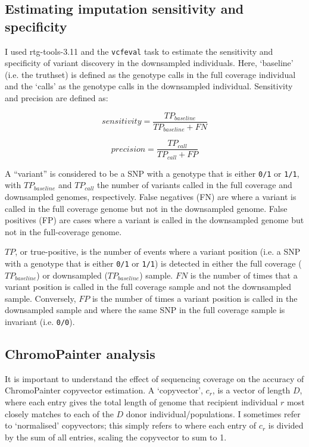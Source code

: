 \subsection{Estimating imputation sensitivity and specificity}

I used rtg-tools-3.11 \cite{cleary2014joint} and the \texttt{vcfeval} task to estimate the sensitivity and specificity of variant discovery in the downsampled individuals. Here, `baseline' (i.e. the truthset) is defined as the genotype calls in the full coverage individual and the `calls' as the genotype calls in the downsampled individual. Sensitivity and precision are defined as: 

\begin{equation}
sensitivity = \frac{TP_{baseline}}{TP_{baseline} + FN}
\end{equation}

\begin{equation}
precision = \frac{TP_{call}}{TP_{call} + FP}
\end{equation}

A ``variant'' is considered to be a SNP with a genotype that is either \texttt{0/1} or \texttt{1/1}, with $TP_{baseline}$ and $TP_{call}$ the number of variants called in the full coverage and downsampled genomes, respectively. False negatives (FN) are where a variant is called in the full coverage genome but not in the downsampled genome. False positives (FP) are cases where a variant is called in the downsampled genome but not in the full-coverage genome.

$TP$, or true-positive, is the number of events where a variant position (i.e. a SNP with a genotype that is either \texttt{0/1} or \texttt{1/1}) is detected in either the full coverage ($TP_{baseline}$) or downsampled ($TP_{baseline}$) sample. $FN$ is the number of times that a variant position is called in the full coverage sample and not the downsampled sample. Conversely, $FP$ is the number of times a variant position is called in the downsampled sample and where the same SNP in the full coverage sample is invariant (i.e. \texttt{0/0}).


\subsection{ChromoPainter analysis} \label{ChromoPainter_analysis}

It is important to understand the effect of sequencing coverage on the accuracy of ChromoPainter copyvector estimation. A `copyvector', $c_{r}$, is a vector of length $D$, where each entry gives the total length of genome that recipient individual $r$ most closely matches to each of the $D$ donor individual/populations. I sometimes refer to `normalised' copyvectors; this simply refers to where each entry of $c_r$ is divided by the sum of all entries, scaling the copyvector to sum to 1. 

